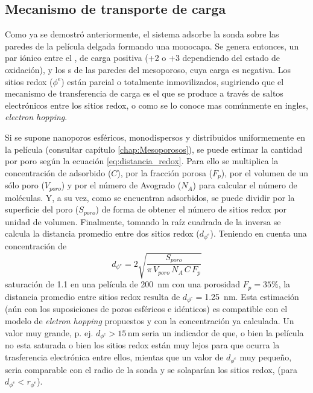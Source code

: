 	\subsection{Mecanismo de transporte de carga}

	 	 Como ya se demostró anteriormente, el sistema adsorbe la sonda sobre las paredes de la película delgada formando una monocapa. Se genera entonces, un par iónico entre el \ru, de carga positiva (+2 o +3 dependiendo del estado de oxidación), y los s de las paredes del mesoporoso, cuya carga es negativa. Los sitios redox ($\phi^{e}$) están parcial o totalmente inmovilizados, sugiriendo que el mecanismo de transferencia de carga es el que se produce a través de saltos electrónicos entre los sitios redox, o como se lo conoce mas comúnmente en ingles, \textit{electron hopping}. \cite{Rohlfing2005,Vila2015,Audebert2015}

	 	 Si se supone nanoporos esféricos, monodispersos y distribuidos uniformemente en la película (consultar capítulo \ref{chap:Mesoporosos}), se puede estimar la cantidad \ru\space por poro según la ecuación \ref{eq:distancia_redox}. Para ello se multiplica la concentración de \ru\space adsorbido ($C$), por la fracción porosa ($F_p$), por el volumen de un sólo poro ($V_{poro}$) y por el número de Avogrado ($N_{A}$) para calcular el número de moléculas. Y, a su vez, como se encuentran adsorbidos, se puede dividir por la superficie del poro ($S_{poro}$) de forma de obtener el número de sitios redox por unidad de volumen. Finalmente, tomando la raíz cuadrada de la inversa se calcula la distancia promedio entre dos sitios redox ($d_{\phi^{e}}$). Teniendo en cuenta una concentración de \linebreak
	 		\begin{equation}
					d_{\phi^{e}}=2\sqrt{\frac{S_{poro}}{\pi\, V_{poro}\, N_A\, C\, F_p}}
					\label{eq:distancia_redox}
			\end{equation}
	     saturación de \SI{1,1}{\Molar} en una película de \SI{200}{nm} con una porosidad $F_p=35\%$, la distancia promedio entre sitios redox resulta de $d_{\phi^{e}}=$\SI{1.25}{nm}. Esta estimación (aún con los suposiciones de poros esféricos e idénticos) es compatible con el modelo de \textit{eletron hopping} propuestos y con la concentración ya calculada. Un valor muy grande, p. ej. $d_{\phi^{e}}>15\, \text{nm}$ seria un indicador de que, o bien la película no esta saturada o bien los sitios redox están muy lejos para que ocurra la trasferencia electrónica entre ellos, mientas que un valor de $d_{\phi^{e}}$ muy pequeño, seria comparable con el radio de la sonda y se solaparían los sitios redox, (para $d_{\phi^{e}} < r_{\phi^{e}}$). 
	

